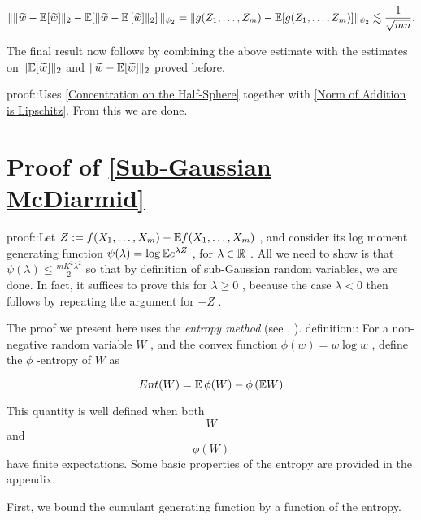 \documentclass{article}
\begin{document}
\begin{equation*}
\|\| \widetilde{w} - \mathbb{E}[\widetilde{w}]\|_2 - \mathbb{E}[\| \widetilde{w} - \mathbb{E}\left[\widetilde{w}]\|_2\right]\|_{\psi_2}= \|g(Z_1,\dots,Z_m) - \mathbb{E}[g(Z_1,\dots,Z_m)]\|_{\psi_2} \lesssim \frac{1}{\sqrt{mn}}.
\end{equation*}

The final result now follows by combining the above estimate with the estimates on  $\|\mathbb{E}[\widetilde{w}]\|_2$  and  $\|\widetilde{w} - \mathbb{E}[\widetilde{w}]\|_2$  proved before.


proof::Uses \autoref{Concentration on the Half-Sphere} together with \autoref{Norm of Addition is Lipschitz}. From this we are done.



\section{Proof of \autoref{Sub-Gaussian McDiarmid}}
\label{section:Proof of \autoref{Sub-Gaussian McDiarmid}}
proof::Let  $Z := f(X_1, \dots, X_m) - \mathbb{E} f(X_1, \dots, X_m)$ , and consider its log moment generating function  $\psi(\lambda) = \log \mathbb{E} e^{\lambda Z}$ , for  $\lambda \in \mathbb{R}$ . All we need to show is that  $\psi(\lambda) \leq \frac{mK^2\lambda^2}{2}$  so that by definition of sub-Gaussian random variables, we are done. In fact, it suffices to prove this for  $\lambda \geq 0$ , because the case  $\lambda < 0$  then follows by repeating the argument for  $-Z$ .

The proof we present here uses the  \textit{entropy method}  (see \cite{boucheronConcentrationInequalitiesNonasymptotic2016}, \cite{wainwrightHighDimensionalStatisticsNonAsymptotic2019}).  definition:: For a non-negative random variable  $W$ , and the convex function  $\phi(w) = w\log w$ , define the  $\phi$ -entropy of  $W$  as


\begin{equation*}
Ent(W) = \mathbb{E}\,\phi(W) - \phi\left(\mathbb{E} W\right)
\end{equation*}

 This quantity is well defined when both  
\begin{equation*}
W
\end{equation*}
  and  
\begin{equation*}
\phi(W)
\end{equation*}
  have finite expectations. Some basic properties of the entropy are provided in the appendix.

First, we bound the cumulant generating function by a function of the entropy.
\end{document}
